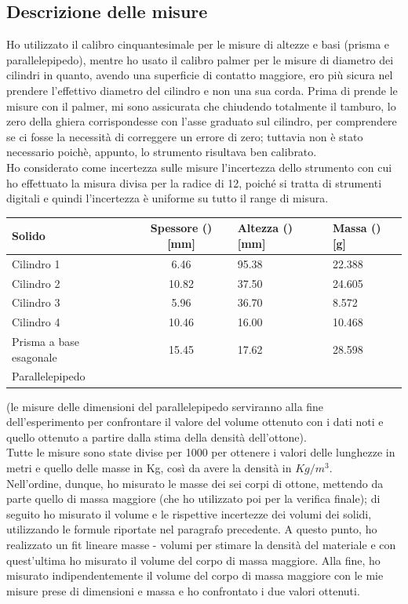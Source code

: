 \documentclass{article}
\begin{document}
\begin{enumerate}
\subsection{Descrizione delle misure} %
Ho utilizzato il calibro cinquantesimale per le misure di altezze e basi (prisma e parallelepipedo), mentre ho usato il calibro palmer per le misure di diametro dei cilindri in quanto, avendo una superficie di contatto maggiore, ero più sicura nel prendere l'effettivo diametro del cilindro e non una sua corda. Prima di prende le misure con il palmer, mi sono assicurata che chiudendo totalmente il tamburo, lo zero della ghiera corrispondesse con l'asse graduato sul cilindro, per comprendere se ci fosse la necessità di correggere un errore di zero; tuttavia non è stato necessario poichè, appunto, lo strumento risultava ben calibrato.\\
Ho considerato come incertezza sulle misure l'incertezza dello strumento con cui ho effettuato la misura divisa per la radice di 12, poiché si tratta di strumenti digitali e quindi l'incertezza è uniforme su tutto il range di misura.\\
\vspace{1em}


\begin{tabular}{lcl}
    \toprule
    Solido & Spessore () [mm] & Altezza () [mm] & Massa () [g]\\
    \midrule
    Cilindro 1 & 6.46 & 95.38 & 22.388\\
    Cilindro 2 & 10.82 & 37.50 & 24.605\\
    Cilindro 3 & 5.96 & 36.70 & 8.572\\
    Cilindro 4 & 10.46 & 16.00 & 10.468\\
    Prisma a base esagonale & 15.45 & 17.62 & 28.598\\
    Parallelepipedo &
    \bottomrule
\end{tabular}
(le misure delle dimensioni del parallelepipedo serviranno alla fine dell'esperimento per confrontare il valore del volume ottenuto con i dati noti e quello ottenuto a partire dalla stima della densità dell'ottone).\\
Tutte le misure sono state divise per 1000 per ottenere i valori delle lunghezze in metri e quello delle masse in Kg, così da avere la densità in $Kg/m^3$.\\

Nell'ordine, dunque, ho misurato le masse dei sei corpi di ottone, mettendo da parte quello di massa maggiore (che ho utilizzato poi per la verifica finale); di seguito ho misurato il volume e le rispettive incertezze dei volumi dei solidi, utilizzando le formule riportate nel paragrafo precedente. A questo punto, ho realizzato un fit lineare masse - volumi per stimare la densità del materiale e con quest'ultima ho misurato il volume del corpo di massa maggiore. Alla fine, ho misurato indipendentemente il volume del corpo di massa maggiore con le mie misure prese di dimensioni e massa e ho confrontato i due valori ottenuti.\\


\end{enumerate}
\end{document}
